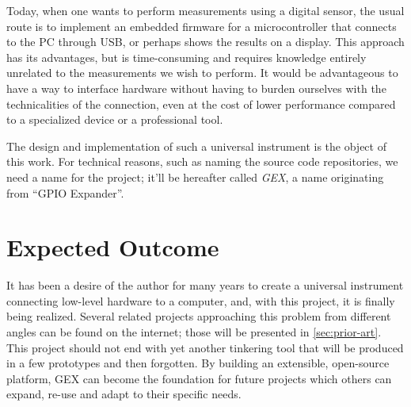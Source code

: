 Today, when one wants to perform measurements using a digital sensor, the usual route is to implement an embedded firmware for a microcontroller that connects to the \gls{PC} through \gls{USB}, or perhaps shows the results on a display. This approach has its advantages, but is time-consuming and requires knowledge entirely unrelated to the measurements we wish to perform. It would be advantageous to have a way to interface hardware without having to burden ourselves with the technicalities of the connection, even at the cost of lower performance compared to a specialized device or a professional tool.

The design and implementation of such a universal instrument is the object of this work. For technical reasons, such as naming the source code repositories, we need a name for the project; it'll be hereafter called \textit{GEX}, a name originating from ``GPIO Expander''.

\section{Expected Outcome}\label{sec:expected-outcome}

It has been a desire of the author for many years to create a universal instrument connecting low-level hardware to a computer, and, with this project, it is finally being realized. Several related projects approaching this problem from different angles can be found on the internet; those will be presented in \cref{sec:prior-art}. This project should not end with yet another tinkering tool that will be produced in a few prototypes and then forgotten. By building an extensible, open-source platform, GEX can become the foundation for future projects which others can expand, re-use and adapt to their specific needs.

